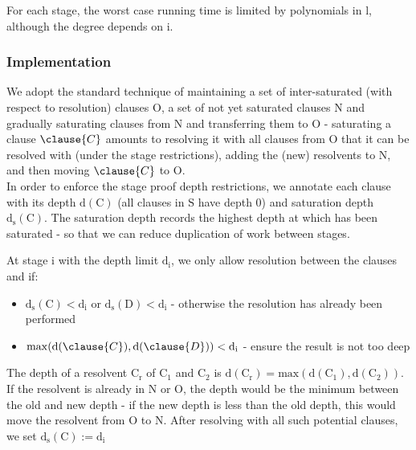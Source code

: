 For each stage, the worst case running time is limited by polynomials in $\mathrm{l}$, although the degree depends on $\mathrm{i}$.

\subsubsection*{Implementation}
We adopt the standard technique of maintaining a set of inter-saturated (with respect to resolution) clauses $\mathrm{O}$, a set of not yet saturated clauses $\mathrm{N}$ and gradually saturating clauses from $\mathrm{N}$ and transferring them to $\mathrm{O}$ - saturating a clause $\clause{C}$ amounts to resolving it with all clauses from $\mathrm{O}$ that it can be resolved with (under the stage restrictions), adding the (new) resolvents to $\mathrm{N}$, and then moving $\clause{C}$ to $\mathrm{O}$.\\
\noindent
In order to enforce the stage proof depth restrictions, we annotate each clause  with its depth $\mathrm{d}(\mathrm{C})$ (all clauses in $\mathrm{S}$ have depth 0) and saturation depth $\mathrm{d_s}(\mathrm{C})$.
The saturation depth records the highest depth at which  has been saturated - so that we can reduce duplication of work between stages.

\noindent
At stage $\mathrm{i}$ with the depth limit $\mathrm{d_i}$, we only allow resolution between the clauses  and  if:
\begin{itemize}
	\item $\mathrm{d_s}(\mathrm{C})<\mathrm{d_i}$ or $\mathrm{d_s}(\mathrm{D})<\mathrm{d_i}$ - otherwise the resolution has already been performed
	\item $\mathrm{max}(\mathrm{d}(\clause{C}),\mathrm{d}(\clause{D}))<\mathrm{d_i}$  - ensure the result is not too deep
\end{itemize}

The depth of a resolvent $\mathrm{C}_\mathrm{r}$ of $\mathrm{C}_1$ and $\mathrm{C}_2$ is $\mathrm{d}(\mathrm{C}_\mathrm{r}) = \mathrm{max}(\mathrm{d}(\mathrm{C}_1),\mathrm{d}(\mathrm{C}_2))$. 
If the resolvent is already in $\mathrm{N}$ or $\mathrm{O}$, the depth would be the minimum between the old and new depth - if the new depth is less than the old depth, this would move the resolvent from $\mathrm{O}$ to $\mathrm{N}$.
After resolving  with all such potential clauses, we set $\mathrm{d_s}(\mathrm{C}) := \mathrm{d_i}$ 

